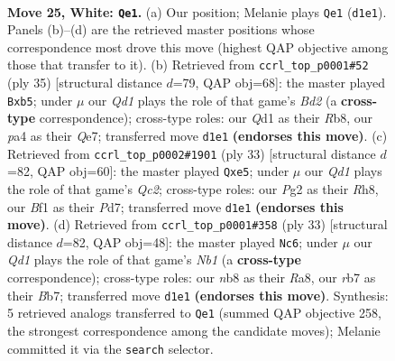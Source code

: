 \documentclass[11pt]{article}
\begin{document}
\clearpage

\begin{figure}[p]\centering
\begin{subfigure}{0.46\textwidth}\centering
\resizebox{\linewidth}{!}{%
\newchessgame
\chessboard[
  setfen={1nq2rk1/1r1b1ppp/8/4Pp2/p1p2P2/6K1/PPP3PP/1R1Q1BNR w - - 4 25},
  showmover=false,
  pgfstyle=straightmove, color=movearrow, markmove={d1-e1}
]}
\caption{}
\end{subfigure}\hfill
\begin{subfigure}{0.46\textwidth}\centering
\resizebox{\linewidth}{!}{%
\newchessgame
\chessboard[
  setfen={rr4k1/2pbqpp1/4p2p/pP6/2BPP3/1QP5/5PPP/R4RK1 b - - 0 18},
  showmover=false,
  pgfstyle=straightmove, color=movearrow, markmove={d7-b5}
]}
\caption{}
\end{subfigure}
\\[4pt]
\begin{subfigure}{0.46\textwidth}\centering
\resizebox{\linewidth}{!}{%
\newchessgame
\chessboard[
  setfen={1r2k2r/2qpnppp/1p2p3/4P3/1RP5/5B2/3P1PPP/3Q1RK1 b k - 0 17},
  showmover=false,
  pgfstyle=straightmove, color=movearrow, markmove={c7-e5}
]}
\caption{}
\end{subfigure}\hfill
\begin{subfigure}{0.46\textwidth}\centering
\resizebox{\linewidth}{!}{%
\newchessgame
\chessboard[
  setfen={rn1r2k1/pb2qpp1/1p2p2p/8/3PP3/P2B1NP1/4QPP1/R2R2K1 b - - 2 17},
  showmover=false,
  pgfstyle=straightmove, color=movearrow, markmove={b8-c6}
]}
\caption{}
\end{subfigure}
\caption{\textbf{Move 25, White: \texttt{Qe1}.} (a) Our position; Melanie plays \texttt{Qe1} (\texttt{d1e1}). Panels (b)--(d) are the retrieved master positions whose correspondence most drove this move (highest QAP objective among those that transfer to it). (b) Retrieved from \texttt{ccrl\_top\_p0001\#52} (ply 35) [structural distance $d$=79, QAP obj=68]: the master played \texttt{Bxb5}; under $\mu$ our \emph{Qd1} plays the role of that game's \emph{Bd2} (a \textbf{cross-type} correspondence); cross-type roles: our \emph{Q}d1 as their \emph{R}b8, our \emph{p}a4 as their \emph{Q}e7; transferred move \texttt{d1e1} \textbf{(endorses this move)}. (c) Retrieved from \texttt{ccrl\_top\_p0002\#1901} (ply 33) [structural distance $d$=82, QAP obj=60]: the master played \texttt{Qxe5}; under $\mu$ our \emph{Qd1} plays the role of that game's \emph{Qc2}; cross-type roles: our \emph{P}g2 as their \emph{R}h8, our \emph{B}f1 as their \emph{P}d7; transferred move \texttt{d1e1} \textbf{(endorses this move)}. (d) Retrieved from \texttt{ccrl\_top\_p0001\#358} (ply 33) [structural distance $d$=82, QAP obj=48]: the master played \texttt{Nc6}; under $\mu$ our \emph{Qd1} plays the role of that game's \emph{Nb1} (a \textbf{cross-type} correspondence); cross-type roles: our \emph{n}b8 as their \emph{R}a8, our \emph{r}b7 as their \emph{B}b7; transferred move \texttt{d1e1} \textbf{(endorses this move)}. Synthesis: 5 retrieved analogs transferred to \texttt{Qe1} (summed QAP objective 258, the strongest correspondence among the candidate moves); Melanie committed it via the \texttt{search} selector.}
\label{fig:thought-m48}
\end{figure}
\end{document}
